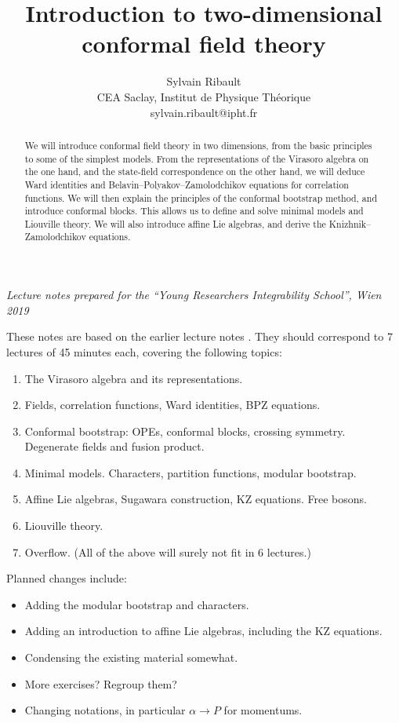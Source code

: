 \documentclass[12pt, a4paper]{article}
\title{\bfseries Introduction to two-dimensional \\ conformal field theory}
\author{Sylvain Ribault \vspace{2mm}
\\
{\normalsize CEA Saclay, Institut de Physique Th\'eorique}
 \\
 {\footnotesize \ttfamily sylvain.ribault@ipht.fr }
}
\theoremstyle{break}
\begin{document}
\maketitle


\begin{abstract}
We will introduce conformal field theory in two dimensions, from the basic principles to some of the simplest models. From the representations of the Virasoro algebra on the one hand, and the state-field correspondence on the other hand, we will deduce Ward identities and Belavin--Polyakov--Zamolodchikov equations for correlation functions. We will then explain the principles of the conformal bootstrap method, and introduce conformal blocks. This allows us to define and solve minimal models and Liouville theory. We will also introduce affine Lie algebras, and derive the Knizhnik--Zamolodchikov equations. 
\end{abstract}

\vspace{1mm}

 \noindent\textit{Lecture notes prepared for the ``Young Researchers Integrability School'', Wien 2019}

\vspace{1mm}

These notes are based on the earlier lecture notes \cite{rib16}. They should correspond to 7 lectures of 45 minutes each, covering the following topics:
\begin{enumerate}
 \item The Virasoro algebra and its representations.

\item Fields, correlation functions, Ward identities, BPZ equations.

\item Conformal bootstrap: OPEs, conformal blocks, crossing symmetry. Degenerate fields and fusion product.

\item Minimal models. Characters, partition functions, modular bootstrap.

\item Affine Lie algebras, Sugawara construction, KZ equations. Free bosons.

\item Liouville theory.

\item Overflow. (All of the above will surely not fit in 6 lectures.)
\end{enumerate}
Planned changes include:
\begin{itemize}
\item Adding the modular bootstrap and characters.
\item Adding an introduction to affine Lie algebras, including the KZ equations.
\item Condensing the existing material somewhat. 
\item More exercises? Regroup them?
 \item Changing notations, in particular $\alpha\to P$ for momentums.
\end{itemize}
\end{document}

